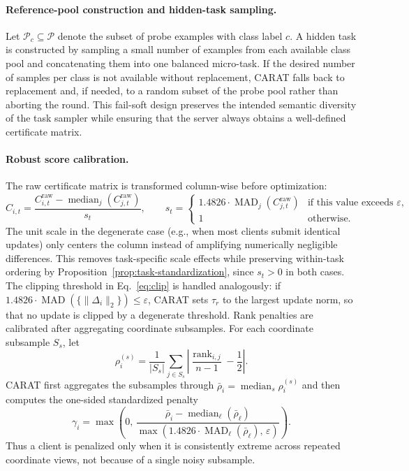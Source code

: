 \paragraph{Reference-pool construction and hidden-task sampling.}
Let $\mathcal{P}_c \subseteq \mathcal{P}$ denote the subset of probe examples with class label $c$. A hidden task is constructed by sampling a small number of examples from each available class pool and concatenating them into one balanced micro-task. If the desired number of samples per class is not available without replacement, CARAT falls back to replacement and, if needed, to a random subset of the probe pool rather than aborting the round. This fail-soft design preserves the intended semantic diversity of the task sampler while ensuring that the server always obtains a well-defined certificate matrix.

\paragraph{Robust score calibration.}
The raw certificate matrix is transformed column-wise before optimization:
\[
C_{i,t}
=
\frac{C^{\mathrm{raw}}_{i,t}-\operatorname{median}_j(C^{\mathrm{raw}}_{j,t})}
{s_t},
\qquad
s_t=
\begin{cases}
1.4826 \cdot \operatorname{MAD}_j(C^{\mathrm{raw}}_{j,t}) & \text{if this value exceeds } \varepsilon,\\
1 & \text{otherwise}.
\end{cases}
\]
The unit scale in the degenerate case (e.g., when most clients submit identical updates) only centers the column instead of amplifying numerically negligible differences. This removes task-specific scale effects while preserving within-task ordering by Proposition~\ref{prop:task-standardization}, since $s_t>0$ in both cases. The clipping threshold in Eq.~\eqref{eq:clip} is handled analogously: if $1.4826\cdot\operatorname{MAD}(\{\|\Delta_i\|_2\})\le\varepsilon$, CARAT sets $\tau_r$ to the largest update norm, so that no update is clipped by a degenerate threshold. Rank penalties are calibrated after aggregating coordinate subsamples. For each coordinate subsample $S_s$, let
\[
\rho_i^{(s)}=
\frac{1}{|S_s|}\sum_{j \in S_s}
\left|
\frac{\operatorname{rank}_{i,j}}{n-1} - \frac{1}{2}
\right|.
\]
CARAT first aggregates the subsamples through $\bar{\rho}_i=\operatorname{median}_s \rho_i^{(s)}$ and then computes the one-sided standardized penalty
\[
\gamma_i=
\max\left(0,\,
\frac{\bar{\rho}_i-\operatorname{median}_\ell(\bar{\rho}_\ell)}
{\max\left(1.4826 \cdot \operatorname{MAD}_\ell(\bar{\rho}_\ell),\,\varepsilon\right)}
\right).
\]
Thus a client is penalized only when it is consistently extreme across repeated coordinate views, not because of a single noisy subsample.

